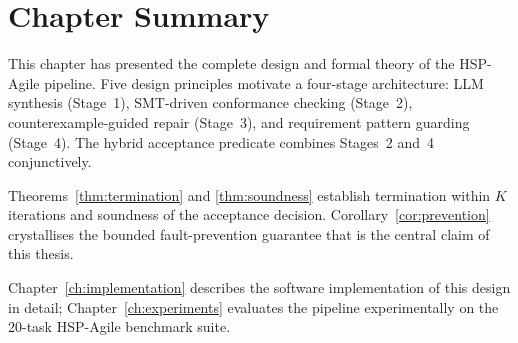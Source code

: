 \begin{table}[t]
  \caption{Summary of HSP-Agile pipeline stages.}
  \label{tab:stage-summary}
  \centering
\end{table}

\section*{Chapter Summary}

This chapter has presented the complete design and formal theory of the
HSP-Agile pipeline.  Five design principles motivate a four-stage architecture:
LLM synthesis (Stage~1), SMT-driven conformance checking (Stage~2),
counterexample-guided repair (Stage~3), and requirement pattern guarding
(Stage~4).  The hybrid acceptance predicate combines Stages~2 and~4
conjunctively.

Theorems~\ref{thm:termination} and \ref{thm:soundness} establish termination
within $K$ iterations and soundness of the acceptance decision.
Corollary~\ref{cor:prevention} crystallises the bounded fault-prevention
guarantee that is the central claim of this thesis.

Chapter~\ref{ch:implementation} describes the software implementation of
this design in detail; Chapter~\ref{ch:experiments} evaluates the pipeline
experimentally on the 20-task HSP-Agile benchmark suite.
